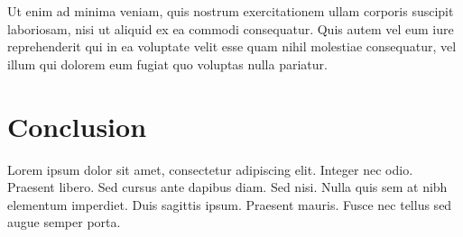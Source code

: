 Ut enim ad minima veniam, quis nostrum exercitationem ullam corporis suscipit
laboriosam, nisi ut aliquid ex ea commodi consequatur. Quis autem vel eum iure
reprehenderit qui in ea voluptate velit esse quam nihil molestiae consequatur,
vel illum qui dolorem eum fugiat quo voluptas nulla pariatur.

\section{Conclusion}
\label{sec:conclusion}

Lorem ipsum dolor sit amet, consectetur adipiscing elit. Integer nec odio.
Praesent libero. Sed cursus ante dapibus diam. Sed nisi. Nulla quis sem at nibh
elementum imperdiet. Duis sagittis ipsum. Praesent mauris. Fusce nec tellus sed
augue semper porta.

